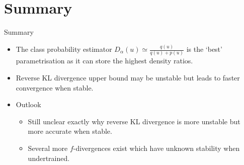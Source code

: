 \documentclass[handout]{beamer}
\begin{document}



\section*{Summary}

\begin{frame}{Summary}
  \begin{itemize}
  \item
    The class probability estimator $D_\alpha(u)\simeq\frac{q(u)}{q(u)+p(u)}$ is the `best' parametrisation as it can store the \alert{highest density ratios}.
  \item
    Reverse KL divergence upper bound may be \alert{unstable} but leads to \alert{faster convergence} when stable.
  \end{itemize}
  
  \begin{itemize}
  \item
    Outlook
    \begin{itemize}
    \item
      Still unclear exactly why reverse KL divergence is more unstable but more accurate when stable.
    \item
      Several more $f$-divergences exist which have unknown stability when undertrained.
    \end{itemize}
  \end{itemize}
\end{frame}
\end{document}
